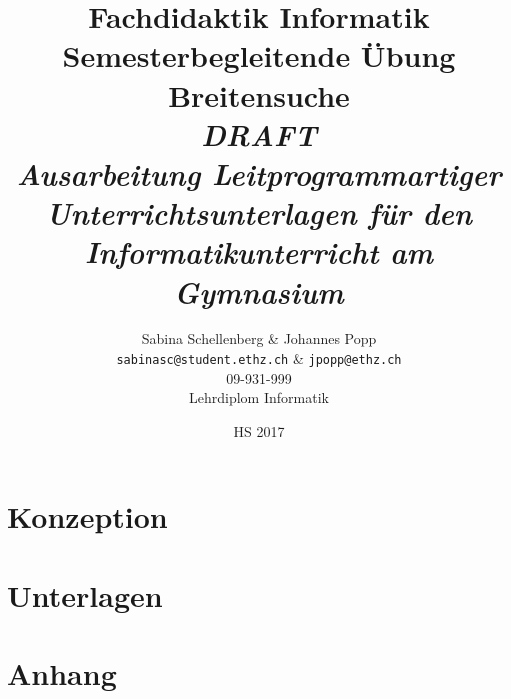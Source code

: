 \documentclass[12pt,a4paper,titlepage]{report}
\theoremstyle{definition}
\begin{document}
\title{
\textbf{Fachdidaktik Informatik} \\ 
\vspace{0cm} 
\Large Semesterbegleitende Übung  \\ 
\vspace{4cm} 
\huge \textbf{Breitensuche} \\ 
\huge{\emph{DRAFT}} \\
\vspace{1cm} 
\large \emph{Ausarbeitung Leitprogrammartiger Unterrichtsunterlagen für den Informatikunterricht am Gymnasium} 
\vspace{4cm}
}

\author{Sabina Schellenberg \& Johannes Popp \\ \texttt{sabinasc@student.ethz.ch} \& \texttt{jpopp@ethz.ch} \\ 09-931-999 \\ Lehrdiplom Informatik}
\date{HS 2017}
\maketitle
\tableofcontents
\setcounter{page}{2}


\chapter{Konzeption}






\chapter{Unterlagen}










%
%
%
%
%
%
%
%
%
%
%
%
%
%




%



\chapter{Anhang}

%


%
\end{document}
